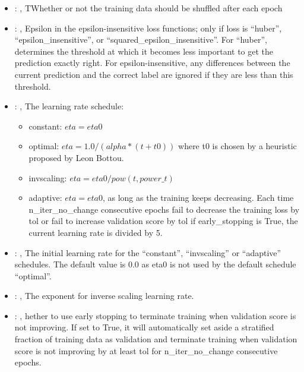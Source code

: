 \begin{itemize}
    \item {}: , 
      TWhether or not the training data should be shuffled after each epoch

    \item {}: , 
      Epsilon in the epsilon-insensitive loss functions; only if loss is ``huber'',
      ``epsilon\_insensitive'', or
      ``squared\_epsilon\_insensitive''. For ``huber'', determines the threshold at which it becomes
      less important to get the                                                  prediction exactly
      right. For epsilon-insensitive, any differences between the current prediction and the correct
      label                                                  are ignored if they are less than this
      threshold.

    \item {}: , 
      The learning rate schedule:                                                  \begin{itemize}
      \item constant: $eta = eta0$                                                   \item optimal:
      $eta = 1.0 / (alpha * (t + t0))$ where t0 is chosen by a heuristic proposed by Leon Bottou.
      \item invscaling: $eta = eta0 / pow(t, power\_t)$
      \item adaptive: $eta = eta0$, as long as the training keeps decreasing. Each time
      n\_iter\_no\_change consecutive epochs fail
      to decrease the training loss by tol or fail to increase validation score by tol if
      early\_stopping is True, the current
      learning rate is divided by 5.                                                  \end{itemize}

    \item {}: , 
      The initial learning rate for the ``constant'', ``invscaling'' or ``adaptive'' schedules. The
      default value is 0.0                                                  as eta0 is not used by
      the default schedule ``optimal''.

    \item {}: , 
      The exponent for inverse scaling learning rate.

    \item {}: , 
      hether to use early stopping to terminate training when validation score is not
      improving. If set to True, it will automatically set aside a stratified fraction of training
      data as validation and terminate training when validation score is not improving by at least
      tol for n\_iter\_no\_change consecutive epochs.


\end{itemize}
